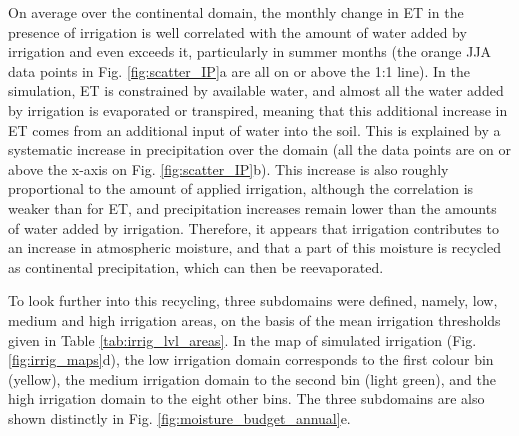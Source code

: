 On average over the continental domain, the monthly change in ET in the presence of irrigation is well correlated with the amount of water added by irrigation and even exceeds it, particularly in summer months (the orange JJA data points in Fig. \ref{fig:scatter_IP}a are all on or above the 1:1 line).
In the simulation, ET is constrained by available water, and almost all the water added by irrigation is evaporated or transpired, meaning that this additional increase in ET comes from an additional input of water into the soil.
This is explained by a systematic increase in precipitation over the domain (all the data points are on or above the x-axis on Fig. \ref{fig:scatter_IP}b). This increase is also roughly proportional to the amount of applied irrigation, although the correlation is weaker than for ET, and precipitation increases remain lower than the amounts of water added by irrigation.
Therefore, it appears that irrigation contributes to an increase in atmospheric moisture, and that a part of this moisture is recycled as continental precipitation, which can then be reevaporated.


To look further into this recycling, three subdomains were defined, namely, low, medium and high irrigation areas, on the basis of the mean irrigation thresholds given in Table \ref{tab:irrig_lvl_areas}. In the map of simulated irrigation (Fig. \ref{fig:irrig_maps}d), the low irrigation domain corresponds to the first colour bin (yellow), the medium irrigation domain to the second bin (light green), and the high irrigation domain to the eight other bins. The three subdomains are also shown distinctly in Fig. \ref{fig:moisture_budget_annual}e.
\begin{table}[h]
    \caption{Subdomains of different irrigation intensity.}
    \label{tab:irrig_lvl_areas}
\end{table}

